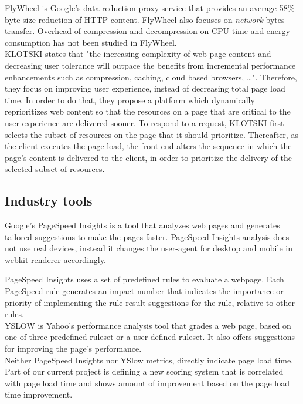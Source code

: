 \noindent FlyWheel\cite{flywheel} is Google's data reduction proxy service that provides an average 58\% byte size reduction of HTTP content. FlyWheel also focuses  on {\em network} bytes transfer. Overhead of compression and decompression on CPU time and energy consumption has not been studied in FlyWheel.\\

\noindent KLOTSKI\cite{klotski} states that "the increasing complexity of web page content and decreasing user tolerance will outpace the benefits from incremental performance enhancements such as compression, caching, cloud based browsers, \ldots". Therefore, they focus on improving user experience, instead of decreasing total page load time. In order to do that, they propose a platform which dynamically reprioritizes web content so that the resources on a page that are critical to the user experience are delivered sooner.
To respond to a request, KLOTSKI first selects the subset of resources on the page that it should prioritize. Thereafter, as the client executes the page load, the front-end alters the sequence in which the page's content is delivered to the client, in order to prioritize the delivery of the selected subset of resources.\\
 \subsection {Industry tools}
Google's PageSpeed Insights \cite{pagespeedinsight} is a tool that analyzes web pages and generates tailored suggestions to make the pages faster. PageSpeed Insights analysis does not use real devices, instead it changes the user-agent for desktop and mobile in webkit renderer accordingly.

\noindent PageSpeed Insights uses a set of predefined rules to evaluate a webpage. Each PageSpeed rule generates an impact number that indicates the importance or priority of implementing the rule-result suggestions for the rule, relative to other rules. \\
 
\noindent YSLOW \cite{yslow} is Yahoo's performance analysis tool that grades a web page, based on one of three predefined ruleset or a user-defined ruleset. It also offers suggestions for improving the page's performance.\\

\noindent Neither PageSpeed Insights nor YSlow metrics, directly indicate page load time. Part of our current project is defining a new scoring system that is correlated with page load time and shows amount of improvement based on the page load time improvement.\\


